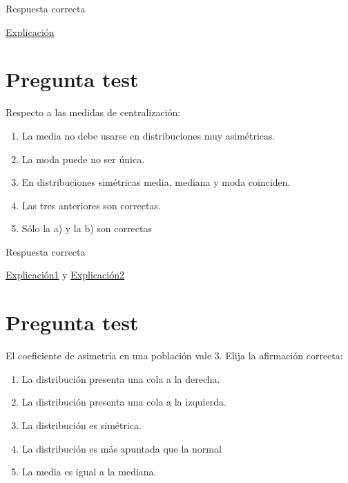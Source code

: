 \documentclass[
]{book}
\providecommand{\tightlist}{%
  \setlength{\itemsep}{0pt}\setlength{\parskip}{0pt}}
\begin{document}
Respuesta correcta

\href{https://1fjmanzano.github.io/bioestadistica/medidas-de-posicio\%CC\%81n-dispersio\%CC\%81n-y-forma.html\#medidas-de-posicio\%CC\%81n-no-centrales}{Explicación}

\hypertarget{pregunta-test-85}{%
\section{Pregunta test}\label{pregunta-test-85}}

Respecto a las medidas de centralización:

\begin{enumerate}
\def\labelenumi{\alph{enumi})}
\tightlist
\item
  La media no debe usarse en distribuciones muy asimétricas.
\item
  La moda puede no ser única.
\item
  En distribuciones simétricas media, mediana y moda coinciden.
\item
  Las tres anteriores son correctas.
\item
  Sólo la a) y la b) son correctas
\end{enumerate}

Respuesta correcta

\href{https://1fjmanzano.github.io/bioestadistica/medidas-de-forma.html}{Explicación1} y \href{https://www.statisticshowto.com/what-is-a-bimodal-distribution/}{Explicación2}

\hypertarget{pregunta-test-86}{%
\section{Pregunta test}\label{pregunta-test-86}}

El coeficiente de asimetría en una población vale 3. Elija la afirmación correcta:

\begin{enumerate}
\def\labelenumi{\alph{enumi})}
\tightlist
\item
  La distribución presenta una cola a la derecha.
\item
  La distribución presenta una cola a la izquierda.
\item
  La distribución es simétrica.
\item
  La distribución es más apuntada que la normal
\item
  La media es igual a la mediana.
\end{enumerate}
\end{document}

